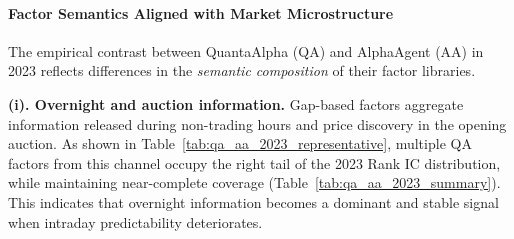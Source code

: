 \paragraph{Factor Semantics Aligned with Market Microstructure}

The empirical contrast between QuantaAlpha (QA) and AlphaAgent (AA) in 2023 reflects differences in the \emph{semantic composition} of their factor libraries.

\textbf{(i). Overnight and auction information.}
Gap-based factors aggregate information released during non-trading hours and price discovery in the opening auction.  
As shown in Table~\ref{tab:qa_aa_2023_representative}, multiple QA factors from this channel occupy the right tail of the 2023 Rank IC distribution, while maintaining near-complete coverage (Table~\ref{tab:qa_aa_2023_summary}). This indicates that overnight information becomes a dominant and stable signal when intraday predictability deteriorates.

